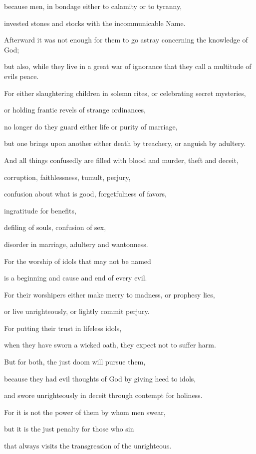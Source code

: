 {\par }{\QB because men, in bondage either to calamity or to tyranny,
\par }{\QB invested stones and stocks with the incommunicable Name.
\par }{\BB \par }{\Q {}Afterward it was not enough for them to go astray concerning the knowledge of God;
\par }{\QB but also, while they live in a great war of ignorance that they call a multitude of evils peace.
\par }{\Q {}For either slaughtering children in solemn rites, or celebrating secret mysteries,
\par }{\QB or holding frantic revels of strange ordinances,
\par }{\Q {}no longer do they guard either life or purity of marriage,
\par }{\QB but one brings upon another either death by treachery, or anguish by adultery.
\par }{\Q {}And all things confusedly are filled with blood and murder, theft and deceit,
\par }{\QB corruption, faithlessness, tumult, perjury,
\par }{\Q {}confusion about what is good, forgetfulness of favors,
\par }{\QB ingratitude for benefits,
\par }{\QB defiling of souls, confusion of sex,
\par }{\QB disorder in marriage, adultery and wantonness.
\par }{\QB {}For the worship of idols that may not be named
\par }{\QB is a beginning and cause and end of every evil.
\par }{\Q {}For their worshipers either make merry to madness, or prophesy lies,
\par }{\QB or live unrighteously, or lightly commit perjury.
\par }{\Q {}For putting their trust in lifeless idols,
\par }{\QB when they have sworn a wicked oath, they expect not to suffer harm.
\par }{\Q {}But for both, the just doom will pursue them,
\par }{\QB because they had evil thoughts of God by giving heed to idols,
\par }{\QB and swore unrighteously in deceit through contempt for holiness.
\par }{\Q {}For it is not the power of them by whom men swear,
\par }{\QB but it is the just penalty for those who sin
\par }{\QB that always visits the transgression of the unrighteous.
\par }{\BB \par }

